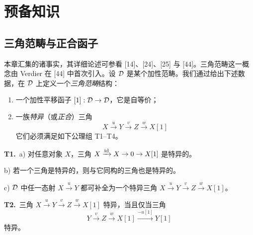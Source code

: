 \chapter{预备知识}
\section{三角范畴与正合函子}

本章汇集的诸事实，其详细论述可参看 [14]、[24]、[25] 与 [44]。三角范畴这一概念由 Verdier 在 [44] 中首次引入。设 $\mathcal{D}$ 是某个加性范畴。我们通过给出下述数据，在 $\mathcal{D}$ 上定义一个\emph{三角范畴}结构：
\begin{enumerate}[label=\alph*),leftmargin=2.4em,itemsep=1pt,topsep=2pt]
\item 一个加性平移函子 $[1]:\mathcal{D}\to\mathcal{D}$，它是自等价；
\item 一族\emph{特异}（或\emph{正合}）三角
\begin{equation*}
X\xrightarrow{\ u\ }Y\xrightarrow{\ v\ }Z\xrightarrow{\ w\ }X[1]
\end{equation*}
它们必须满足如下公理组 T1--T4。
\end{enumerate}

\noindent\textbf{T1.}\ a) 对任意对象 $X$，三角 $X\xrightarrow{\mathrm{id}}X\to 0\to X[1]$ 是特异的。

\noindent\hspace*{1.6em}b) 若一个三角是特异的，则与它同构的三角也是特异的。

\noindent\hspace*{1.6em}c) $\mathcal{D}$ 中任一态射 $X\xrightarrow{u}Y$ 都可补全为一个特异三角 $X\xrightarrow{u}Y\xrightarrow{v}Z\xrightarrow{w}X[1]$。

\noindent\textbf{T2.}\ 三角 $X\xrightarrow{u}Y\xrightarrow{v}Z\xrightarrow{w}X[1]$ 特异，当且仅当三角
\begin{equation*}
Y\xrightarrow{\ v\ }Z\xrightarrow{\ w\ }X[1]\xrightarrow{-u[1]}Y[1]
\end{equation*}
特异。

